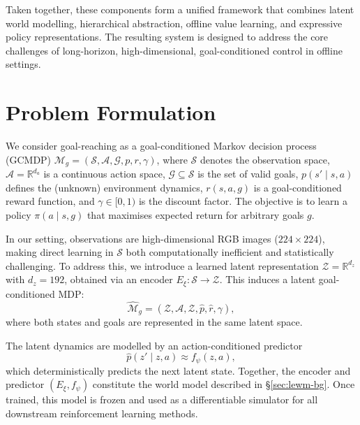 \medskip

Taken together, these components form a unified framework that combines
latent world modelling, hierarchical abstraction, offline value learning,
and expressive policy representations. The resulting system is designed to
address the core challenges of long-horizon, high-dimensional,
goal-conditioned control in offline settings.

\section{Problem Formulation}
\label{sec:problem}

We consider goal-reaching as a goal-conditioned Markov decision process
(GCMDP) $\mathcal{M}_g = (\mathcal{S}, \mathcal{A}, \mathcal{G}, p, r, \gamma)$,
where $\mathcal{S}$ denotes the observation space, $\mathcal{A} = \mathbb{R}^{d_a}$
is a continuous action space, $\mathcal{G} \subseteq \mathcal{S}$ is the set of
valid goals, $p(s' \mid s,a)$ defines the (unknown) environment dynamics,
$r(s,a,g)$ is a goal-conditioned reward function, and $\gamma \in [0,1)$ is the
discount factor. The objective is to learn a policy $\pi(a \mid s, g)$ that
maximises expected return for arbitrary goals $g$.

In our setting, observations are high-dimensional RGB images
($224 \times 224$), making direct learning in $\mathcal{S}$ both
computationally inefficient and statistically challenging. To address this,
we introduce a learned latent representation $\mathcal{Z} = \mathbb{R}^{d_z}$
with $d_z = 192$, obtained via an encoder $E_\xi : \mathcal{S} \to \mathcal{Z}$.
This induces a latent goal-conditioned MDP:
\begin{equation}
\widehat{\mathcal{M}}_g
= (\mathcal{Z}, \mathcal{A}, \mathcal{Z}, \hat{p}, \hat{r}, \gamma),
\end{equation}
where both states and goals are represented in the same latent space.

The latent dynamics are modelled by an action-conditioned predictor
\begin{equation}
\hat{p}(z' \mid z, a) \approx f_\psi(z, a),
\end{equation}
which deterministically predicts the next latent state. Together, the encoder
and predictor $(E_\xi, f_\psi)$ constitute the world model described in
\S\ref{sec:lewm-bg}. Once trained, this model is frozen and used as a
differentiable simulator for all downstream reinforcement learning methods.

